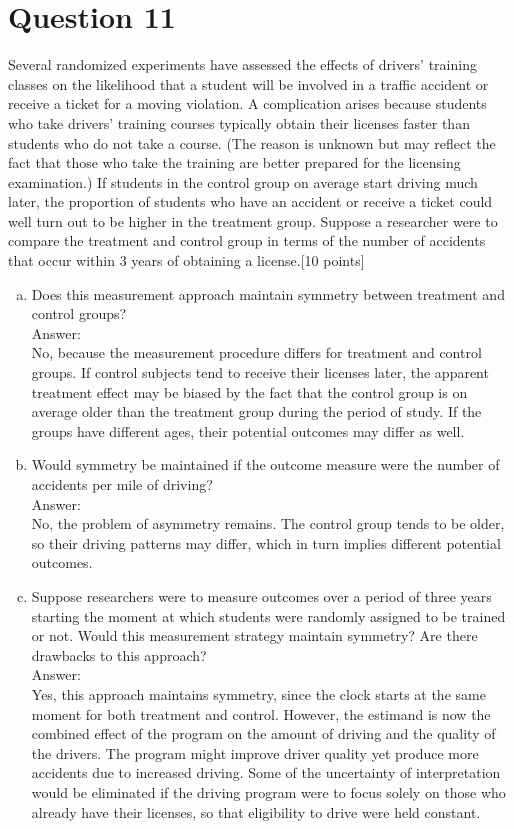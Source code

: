 \documentclass[11pt,notitlepage]{article}		%
\begin{document}
\section*{Question 11}
Several randomized experiments have assessed the effects of drivers' training classes on the likelihood that a student will be involved in a traffic accident or receive a ticket for a moving violation.   A complication arises because students who take drivers' training courses typically obtain their licenses faster than students who do not take a course. (The reason is unknown but may reflect the fact that those who take the training are better prepared for the licensing examination.)  If students in the control group on average start driving much later, the proportion of students who have an accident or receive a ticket could well turn out to be higher in the treatment group.  Suppose a researcher were to compare the treatment and control group in terms of the number of accidents that occur within 3 years of obtaining a license.[10 points]

\begin{enumerate}[a)]
\item Does this measurement approach maintain symmetry between treatment and control groups?  \\
Answer:\\
No, because the measurement procedure differs for treatment and control groups.  If control subjects tend to receive their licenses later, the apparent treatment effect may be biased by the fact that the control group is on average older than the treatment group during the period of study.  If the groups have different ages, their potential outcomes may differ as well.\\
\item Would symmetry be maintained if the outcome measure were the number of accidents per mile of driving?  \\
Answer:\\
No, the problem of asymmetry remains.  The control group tends to be older, so their driving patterns may differ, which in turn implies different potential outcomes.
\item Suppose researchers were to measure outcomes over a period of three years starting the moment at which students were randomly assigned to be trained or not.  Would this measurement strategy maintain symmetry?  Are there drawbacks to this approach? \\
Answer:\\
Yes, this approach maintains symmetry, since the clock starts at the same moment for both treatment and control.  However, the estimand is now the combined effect of the program on the amount of driving and the quality of the drivers. The program might improve driver quality yet produce more accidents due to increased driving.  Some of the uncertainty of interpretation would be eliminated if the driving program were to focus solely on those who already have their licenses, so that eligibility to drive were held constant.
\end{enumerate}
\end{document}
